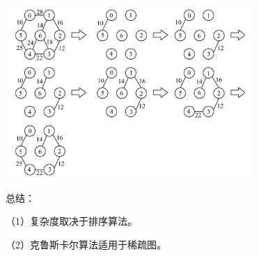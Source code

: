 {\includegraphics[width=3.70833in,height=2.59375in]{png-jpeg-pics/07BF7741A39C5FE66EBE18C782A6EC16.png}\\
\hspace*{0.333em}}

{总结：}

{（1）复杂度取决于排序算法。}

{（2）克鲁斯卡尔算法适用于稀疏图。}
